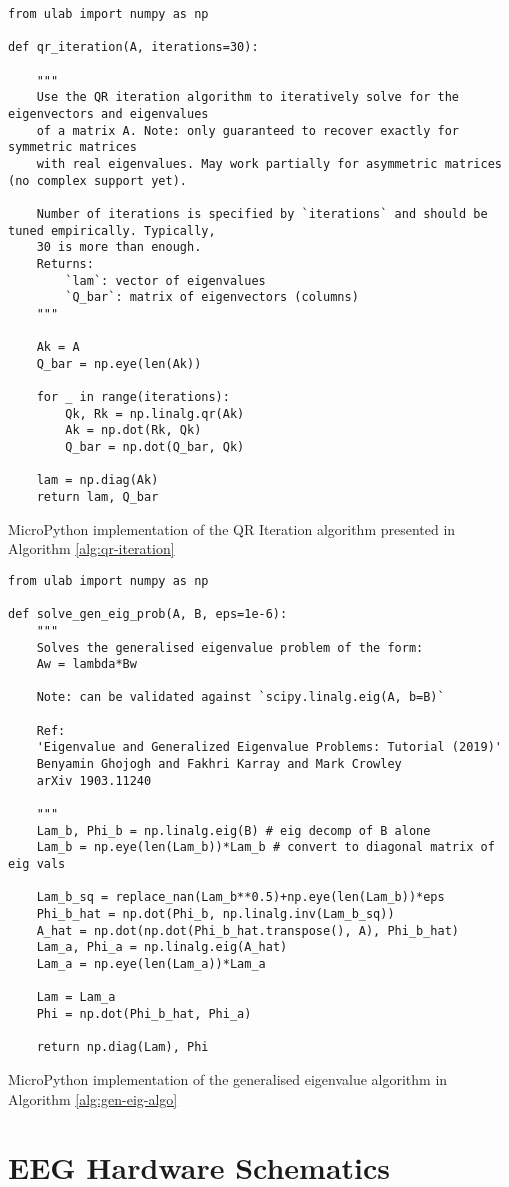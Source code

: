 \begin{listing}[!htb]
\small
\begin{verbatim}
from ulab import numpy as np

def qr_iteration(A, iterations=30):
    
    """
    Use the QR iteration algorithm to iteratively solve for the eigenvectors and eigenvalues
    of a matrix A. Note: only guaranteed to recover exactly for symmetric matrices
    with real eigenvalues. May work partially for asymmetric matrices (no complex support yet).
    
    Number of iterations is specified by `iterations` and should be tuned empirically. Typically,
    30 is more than enough.
    Returns:
        `lam`: vector of eigenvalues
        `Q_bar`: matrix of eigenvectors (columns)
    """

    Ak = A
    Q_bar = np.eye(len(Ak))

    for _ in range(iterations):
        Qk, Rk = np.linalg.qr(Ak)
        Ak = np.dot(Rk, Qk)
        Q_bar = np.dot(Q_bar, Qk)

    lam = np.diag(Ak)
    return lam, Q_bar

\end{verbatim}
\caption{MicroPython implementation of the QR Iteration algorithm presented in Algorithm \ref{alg:qr-iteration}}
\label{app-listing:qr-iteration-mpy}
\end{listing}

\begin{listing}[!htb]
\small
\begin{verbatim}
from ulab import numpy as np

def solve_gen_eig_prob(A, B, eps=1e-6):
    """
    Solves the generalised eigenvalue problem of the form:
    Aw = lambda*Bw
    
    Note: can be validated against `scipy.linalg.eig(A, b=B)`
    
    Ref: 
    'Eigenvalue and Generalized Eigenvalue Problems: Tutorial (2019)'
    Benyamin Ghojogh and Fakhri Karray and Mark Crowley
    arXiv 1903.11240

    """
    Lam_b, Phi_b = np.linalg.eig(B) # eig decomp of B alone
    Lam_b = np.eye(len(Lam_b))*Lam_b # convert to diagonal matrix of eig vals
    
    Lam_b_sq = replace_nan(Lam_b**0.5)+np.eye(len(Lam_b))*eps
    Phi_b_hat = np.dot(Phi_b, np.linalg.inv(Lam_b_sq))
    A_hat = np.dot(np.dot(Phi_b_hat.transpose(), A), Phi_b_hat)
    Lam_a, Phi_a = np.linalg.eig(A_hat)
    Lam_a = np.eye(len(Lam_a))*Lam_a
    
    Lam = Lam_a
    Phi = np.dot(Phi_b_hat, Phi_a)
    
    return np.diag(Lam), Phi

\end{verbatim}
\caption{MicroPython implementation of the generalised eigenvalue algorithm in Algorithm \ref{alg:gen-eig-algo}}
\label{app-listing:gen-eig-prob-mpy}
\end{listing}

\section{EEG Hardware Schematics}

\label{appendix:schematics}

